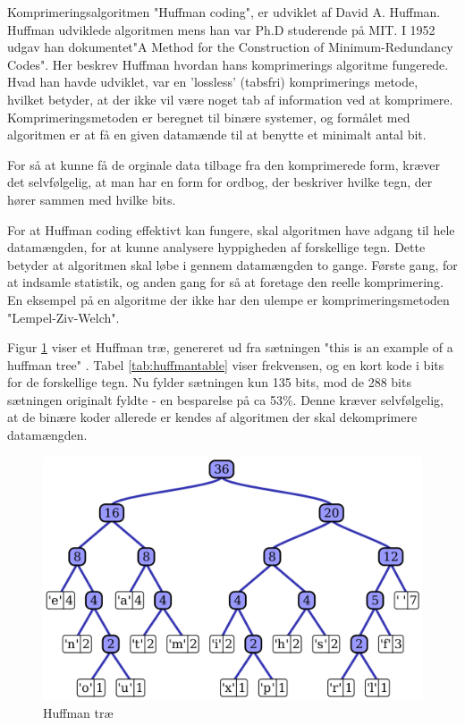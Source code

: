 Komprimeringsalgoritmen "Huffman coding", er udviklet af David A. Huffman. Huffman udviklede algoritmen mens han var Ph.D studerende på MIT. I 1952 udgav han dokumentet"A Method for the Construction of Minimum-Redundancy Codes"\cite{A_Method_for}. Her beskrev Huffman hvordan hans komprimerings algoritme fungerede. Hvad han havde udviklet, var en 'lossless' (tabsfri) komprimerings metode, hvilket betyder, at der ikke vil være noget tab af information ved at komprimere. Komprimeringsmetoden er beregnet til binære systemer, og formålet med algoritmen er at få en given datamænde til at benytte et minimalt antal bit. 

For så at kunne få de orginale data tilbage fra den komprimerede form, kræver det selvfølgelig, at man har en form for ordbog, der beskriver hvilke tegn, der hører sammen med hvilke bits.

For at Huffman coding effektivt kan fungere, skal algoritmen have adgang til hele datamængden, for at kunne analysere hyppigheden af forskellige tegn. Dette betyder at algoritmen skal løbe i gennem datamængden to gange. Første gang, for at indsamle statistik, og anden gang for så at foretage den reelle komprimering. En eksempel på en algoritme der ikke har den ulempe er komprimeringsmetoden "Lempel-Ziv-Welch".

Figur \ref{fig:huffmantree} viser et Huffman træ, genereret ud fra sætningen "this is an example of a huffman tree" \cite{huff_wiki}. Tabel \ref{tab:huffmantable} viser frekvensen, og en kort kode i bits for de forskellige tegn. Nu fylder sætningen kun 135 bits, mod de 288 bits sætningen originalt fyldte - en besparelse på ca 53\%. Denne kræver selvfølgelig, at de binære koder allerede er kendes af algoritmen der skal dekomprimere datamængden.

\begin{figure}[H]
\centering
\includegraphics[width=\linewidth]{Billeder/Huffman_tree_2.png}
\caption{Huffman træ}
\label{fig:huffmantree}
\end{figure}


